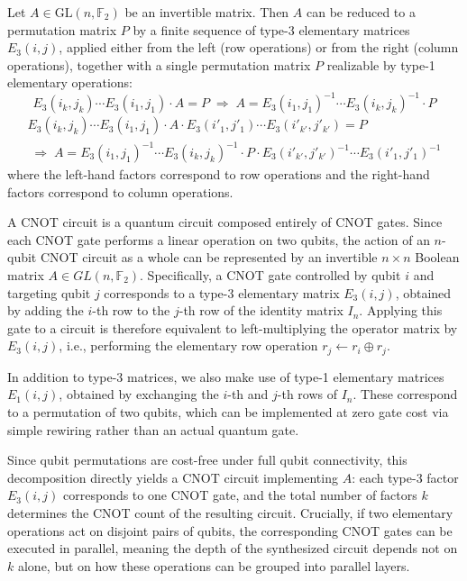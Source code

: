 \begin{theorem}
\label{thm:elementary-matrix-operation-type-1-and-3}
Let $A \in \mathrm{GL}(n, \mathbb{F}_2)$ be an invertible matrix. Then $A$
can be reduced to a permutation matrix $P$ by a finite sequence of type-3
elementary matrices $E_{3}(i, j)$, applied either from the left
(row operations) or from the right (column operations), together with a
single permutation matrix $P$ realizable by type-1 elementary operations:
\begin{equation}
	\label{eq:elementary-matrix-left-multiplication}
	E_{3}(i_{k}, j_{k}) \cdots E_{3}(i_{1}, j_{1}) \cdot A = P
	\;\Longrightarrow\;
	A = E_{3}(i_{1}, j_{1})^{-1} \cdots E_{3}(i_{k}, j_{k})^{-1} \cdot P
\end{equation}
\begin{align}
	\label{eq:elementary-matrix-left-right-multiplication}
	E_{3}(i_{k}, j_{k}) \cdots E_{3}(i_{1}, j_{1}) \cdot A \cdot E_{3}(i'_{1}, j'_{1}) \cdots E_{3}(i'_{k'}, j'_{k'}) = P
	\\\;\Longrightarrow\;
	A = E_{3}(i_{1}, j_{1})^{-1} \cdots E_{3}(i_{k}, j_{k})^{-1} \cdot P \cdot E_{3}(i'_{k'}, j'_{k'})^{-1} \cdots E_{3}(i'_{1}, j'_{1})^{-1}
\end{align}
where the left-hand factors correspond to row operations and the
right-hand factors correspond to column operations.
\end{theorem}

A CNOT circuit is a quantum circuit composed entirely of CNOT gates. 
Since each CNOT gate performs a linear operation on two qubits, 
the action of an $n$-qubit CNOT circuit as a whole can be 
represented by an invertible $n \times n$ Boolean matrix $A \in GL(n, \mathbb{F}_{2})$. 
Specifically, a CNOT gate controlled by qubit $i$ and targeting qubit 
$j$ corresponds to a type-3 elementary matrix $E_{3}(i, j)$, obtained by adding the $i$-th row to the $j$-th row of the identity matrix $I_{n}$. Applying this gate to a circuit is therefore equivalent to left-multiplying the operator matrix by $E_{3}(i, j)$, i.e., performing the elementary row operation $r_{j} \leftarrow r_{i} \oplus r_{j}$.

In addition to type-3 matrices, we also make use of type-1 elementary matrices $E_{1}(i, j)$, obtained by exchanging the $i$-th and $j$-th rows of $I_{n}$. These correspond to a permutation of two qubits, which can be implemented at zero gate cost via simple rewiring rather than an actual quantum gate.

Since qubit permutations are cost-free under full qubit connectivity, this decomposition directly yields a CNOT circuit implementing $A$: each type-3 factor $E_{3}(i, j)$ corresponds to one CNOT gate, and the total number of factors $k$ determines the CNOT count of the resulting circuit. Crucially, if two elementary operations act on disjoint pairs of qubits, the corresponding CNOT gates can be executed in parallel, meaning the depth of the synthesized circuit depends not on $k$ alone, but on how these operations can be grouped into parallel layers.

